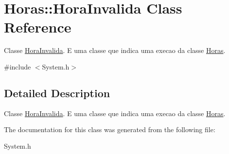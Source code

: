 \hypertarget{class_horas_1_1_hora_invalida}{}\section{Horas\+:\+:Hora\+Invalida Class Reference}
\label{class_horas_1_1_hora_invalida}


Classe \hyperlink{class_horas_1_1_hora_invalida}{Hora\+Invalida}. E uma classe que indica uma execao da classe \hyperlink{class_horas}{Horas}.  




{\ttfamily \#include $<$System.\+h$>$}



\subsection{Detailed Description}
Classe \hyperlink{class_horas_1_1_hora_invalida}{Hora\+Invalida}. E uma classe que indica uma execao da classe \hyperlink{class_horas}{Horas}. 

The documentation for this class was generated from the following file\+:\begin{DoxyCompactItemize}
\item 
System.\+h\end{DoxyCompactItemize}
